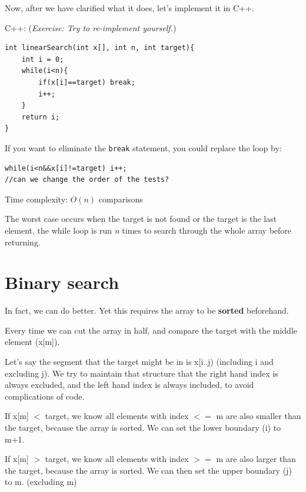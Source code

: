 Now, after we have clarified what it does, let's implement it in C++.
\vspace{6mm}

C++: (\textit{Exercise: Try to re-implement yourself.})
\begin{lstlisting}
int linearSearch(int x[], int n, int target){
    int i = 0;
    while(i<n){
        if(x[i]==target) break;
        i++;
    }
    return i;
}
\end{lstlisting}

If you want to eliminate the \texttt{break} statement, you could replace the loop by:

\begin{lstlisting}
while(i<n&&x[i]!=target) i++;
//can we change the order of the tests?
\end{lstlisting}

Time complexity: $O(n)$ comparisons
\vspace{6mm}

The worst case occurs when the target is not found or the target is the last element, the while loop is run \textit{n} times to search through the whole array before returning.

\pagebreak

\section{Binary search}

In fact, we can do better. Yet this requires the array to be \textbf{sorted} beforehand.

Every time we can cut the array in half, and compare the target with the middle element (x[m]). 
\vspace{6mm}

Let's say the segment that the target might be in is x[i..j) (including i and excluding j). We try to maintain that structure that the right hand index is always excluded, and the left hand index is always included, to avoid complications of code.
\vspace{6mm}

If x[m] $<$ target, we know all elements with index $<=$ m are also smaller than the target, because the array is sorted. We can set the lower boundary (i) to m+1.

If x[m] $>$ target, we know all elements with index $>=$ m are also larger than the target, because the array is sorted. We can then set the upper boundary (j) to m. (excluding m)
\vspace{6mm}

